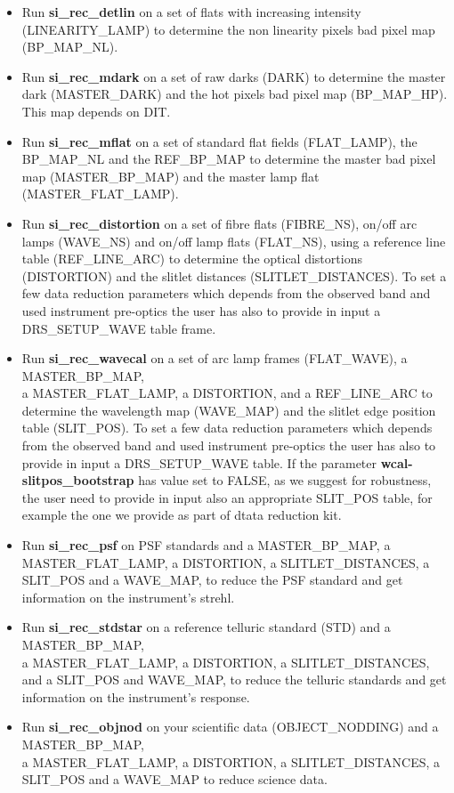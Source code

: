 \begin{itemize}
\item Run {\bf si\_rec\_detlin} on a set of flats with increasing 
intensity (LINEARITY\_LAMP) to determine the non linearity pixels bad pixel 
map (BP\_MAP\_NL).



\item Run {\bf si\_rec\_mdark} on a set of raw darks (DARK) to determine 
the master dark (MASTER\_DARK) and the hot pixels bad pixel map (BP\_MAP\_HP).
This map depends on DIT.

\item Run {\bf si\_rec\_mflat} on a set of standard flat fields (FLAT\_LAMP), 
the BP\_MAP\_NL and the REF\_BP\_MAP to determine the master bad pixel map 
(MASTER\_BP\_MAP) and the master lamp flat (MASTER\_FLAT\_LAMP).

\item Run {\bf si\_rec\_distortion} on a set of fibre flats (FIBRE\_NS), 
on/off arc lamps (WAVE\_NS) and on/off lamp flats (FLAT\_NS), using a 
reference line table (REF\_LINE\_ARC) to determine the optical distortions 
(DISTORTION) and the slitlet distances (SLITLET\_DISTANCES).
To set a few data reduction parameters which depends from the observed 
band and used instrument pre-optics the user has also to provide in input 
a DRS\_SETUP\_WAVE table frame.



\item Run {\bf si\_rec\_wavecal} on a set of arc lamp frames (FLAT\_WAVE), 
a MASTER\_BP\_MAP, \\ 
a MASTER\_FLAT\_LAMP, a DISTORTION, and a REF\_LINE\_ARC 
to determine the wavelength map (WAVE\_MAP) and the slitlet edge position 
table (SLIT\_POS). To set a few data reduction parameters which depends 
from the observed band and used instrument pre-optics the user has also 
to provide in input a DRS\_SETUP\_WAVE table. If the parameter 
{\bf wcal-slitpos\_bootstrap} has value set to FALSE, as we suggest for 
robustness, the user need to provide in input also an appropriate 
SLIT\_POS table, for example the one we provide as part of dtata reduction kit.

\item Run {\bf si\_rec\_psf} on PSF standards and  a MASTER\_BP\_MAP, 
a MASTER\_FLAT\_LAMP, a DISTORTION, a SLITLET\_DISTANCES, a SLIT\_POS and 
a WAVE\_MAP, to reduce the PSF standard and get information on the 
instrument's strehl.

\item Run {\bf si\_rec\_stdstar} on a reference telluric standard (STD) 
and a MASTER\_BP\_MAP, \\
 a MASTER\_FLAT\_LAMP, a DISTORTION, a SLITLET\_DISTANCES, and a SLIT\_POS and 
WAVE\_MAP, to reduce the telluric standards and get information on the 
instrument's response.

\item Run {\bf si\_rec\_objnod} on your scientific data (OBJECT\_NODDING) 
and a MASTER\_BP\_MAP, \\
a MASTER\_FLAT\_LAMP, a DISTORTION, a SLITLET\_DISTANCES, a 
SLIT\_POS and a WAVE\_MAP to reduce science data.
\end{itemize}

